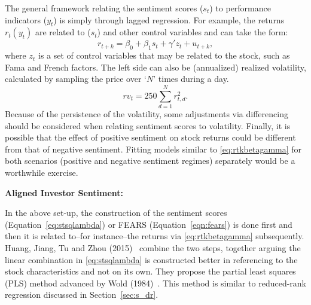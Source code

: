 The general framework relating the sentiment scores ($s_t$) to performance indicators ($y_t$) is simply through lagged regression. For example, the returns $r_t(y_t)$ are related to ($s_t$) and other control variables and can take the form:
	\begin{equation} \label{eq:rtkbetagamma}
	r_{t+k}= \beta_0 + \beta_1 s_t + \gamma' z_t + u_{t+k},
	\end{equation}
where $z_t$ is a set of control variables that may be related to the stock, such as Fama and French factors. The left side can also be (annualized) realized volatility, calculated by sampling the price over `$N$' times during a day. 
	\begin{equation}
	rv_t = 250 \sum_{d=1}^N r_{t,d}^2.
	\end{equation}
Because of the persistence of the volatility, some adjustments via differencing should be considered when relating sentiment scores to volatility. Finally, it is possible that the effect of positive sentiment on stock returns could be different from that of negative sentiment. Fitting models similar to \eqref{eq:rtkbetagamma} for both scenarios (positive and negative sentiment regimes) separately would be a worthwhile exercise. \twomedskip


\noindent\textbf{Aligned Investor Sentiment:} \twomedskip


In the above set-up, the construction of the sentiment scores (Equation~\ref{eq:stsqlambda}) or FEARS (Equation~\ref{eqn:fears}) is done first and then it is related to--for instance--the returns via \eqref{eq:rtkbetagamma} subsequently. Huang, Jiang, Tu and Zhou (2015)~\cite{huang} combine the two steps, together arguing the linear combination in \eqref{eq:stsqlambda} is constructed better in referencing to the stock characteristics and not on its own. They propose the partial least squares (PLS) method advanced by Wold (1984)~\cite{wold}. This method is similar to reduced-rank regression discussed in Section~\ref{sec:s_dr}. \twomedskip


